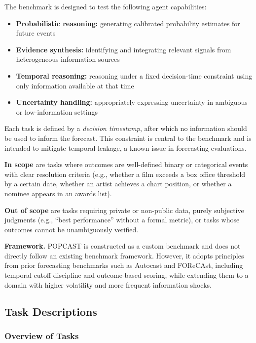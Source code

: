 \documentclass{article} %
\newcommand{\benchmarkname}{POPCAST}
\begin{document}
The benchmark is designed to test the following agent capabilities:
\begin{itemize}[noitemsep]
    \item \textbf{Probabilistic reasoning:} generating calibrated probability estimates for future events
    \item \textbf{Evidence synthesis:} identifying and integrating relevant signals from heterogeneous information sources
    \item \textbf{Temporal reasoning:} reasoning under a fixed decision-time constraint using only information available at that time
    \item \textbf{Uncertainty handling:} appropriately expressing uncertainty in ambiguous or low-information settings
\end{itemize}

Each task is defined by a \textit{decision timestamp}, after which no information should be used to inform the forecast. This constraint is central to the benchmark and is intended to mitigate temporal leakage, a known issue in forecasting evaluations.

\textbf{In scope} are tasks where outcomes are well-defined binary or categorical events with clear resolution criteria (e.g., whether a film exceeds a box office threshold by a certain date, whether an artist achieves a chart position, or whether a nominee appears in an awards list). 

\textbf{Out of scope} are tasks requiring private or non-public data, purely subjective judgments (e.g., ``best performance'' without a formal metric), or tasks whose outcomes cannot be unambiguously verified.

\textbf{Framework.} \benchmarkname{} is constructed as a custom benchmark and does not directly follow an existing benchmark framework. However, it adopts principles from prior forecasting benchmarks such as Autocast and FOReCAst, including temporal cutoff discipline and outcome-based scoring, while extending them to a domain with higher volatility and more frequent information shocks.

\subsection{Task Descriptions}

\subsubsection{Overview of Tasks}
\end{document}
